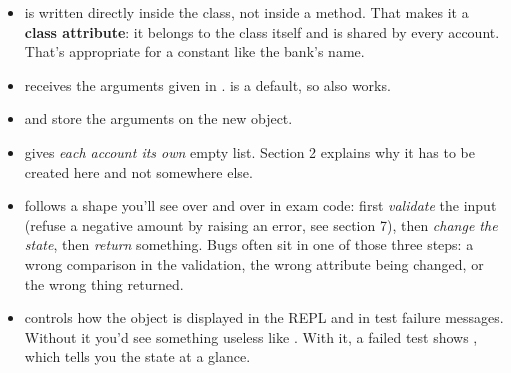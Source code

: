 \documentclass[10pt,a4paper]{article}
\begin{document}
\begin{itemize}
\item \textbf{} is written directly inside the class, not inside a method. That makes it a \textbf{class attribute}: it belongs to the class itself and is shared by every account. That’s appropriate for a constant like the bank’s name.
\item \textbf{} receives the arguments given in .  is a default, so  also works.
\item \textbf{} and \textbf{} store the arguments on the new object.
\item \textbf{} gives \emph{each account its own} empty list. Section 2 explains why it has to be created here and not somewhere else.
\item \textbf{} follows a shape you’ll see over and over in exam code: first \emph{validate} the input (refuse a negative amount by raising an error, see section 7), then \emph{change the state}, then \emph{return} something. Bugs often sit in one of those three steps: a wrong comparison in the validation, the wrong attribute being changed, or the wrong thing returned.
\item \textbf{} controls how the object is displayed in the REPL and in test failure messages. Without it you’d see something useless like . With it, a failed test shows , which tells you the state at a glance.
\end{itemize}
\end{document}
